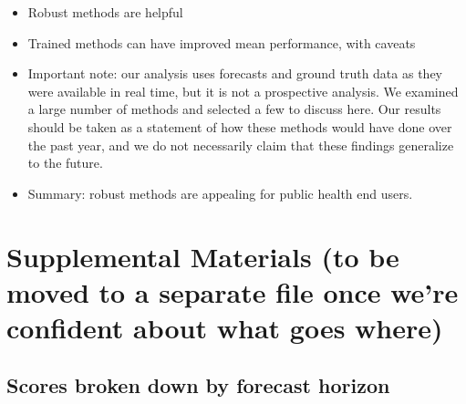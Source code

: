 \documentclass[review]{elsarticle}
\begin{document}
\begin{itemize}
  \item Robust methods are helpful
  \item Trained methods can have improved mean performance, with caveats
  \item Important note: our analysis uses forecasts and ground truth data as they were available in real time, but it is not a prospective analysis.  We examined a large number of methods and selected a few to discuss here.  Our results should be taken as a statement of how these methods would have done over the past year, and we do not necessarily claim that these findings generalize to the future.
  \item Summary: robust methods are appealing for public health end users.
\end{itemize}

\section{Supplemental Materials (to be moved to a separate file once we're confident about what goes where)}

\subsection{Scores broken down by forecast horizon}
\end{document}
